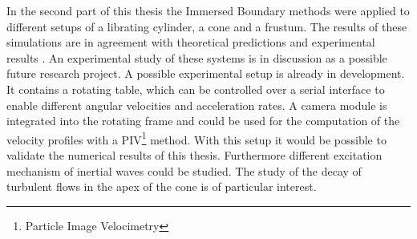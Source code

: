 In the second part of this thesis the Immersed Boundary methods were applied to different setups of a librating cylinder,  a cone and a frustum.
The results of these simulations are in agreement with theoretical
predictions \citep{Greenspan1969} and experimental results \cite{Beardsley1970}.
An experimental study of these systems is in discussion as a possible future research project.
A possible experimental setup is already in development.
It contains a rotating table, which can be controlled over a serial interface to enable different angular velocities and acceleration rates.
A camera module is integrated into the rotating frame and could be used for the computation
of the velocity profiles with a PIV\footnote{Particle Image Velocimetry}
method.
With this setup it would be possible to validate the numerical results of this thesis.
Furthermore different excitation mechanism of inertial waves could be studied.
The study of the decay of turbulent flows in the apex of the cone is of particular interest.

